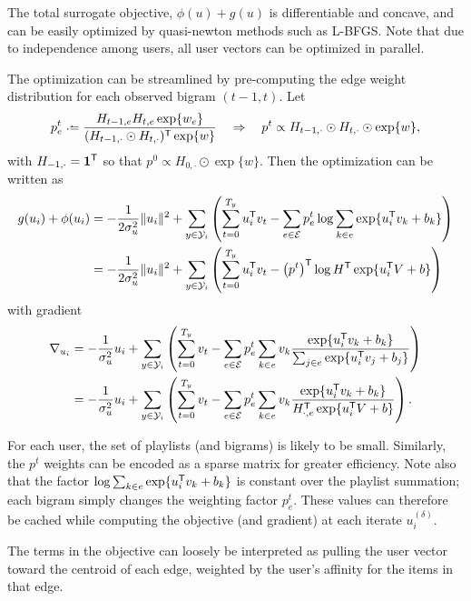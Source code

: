 \documentclass{article}
\def\E{\ensuremath{\mathcal{E}}}
\begin{document}
The total surrogate objective, $\phi(u) + g(u)$ is differentiable and concave, and can be easily optimized by quasi-newton methods such as L-BFGS.
Note that due to independence among users, all user vectors can be optimized in parallel.

The optimization can be streamlined by pre-computing the edge weight distribution for
each observed bigram $(t-1, t)$.  Let 
\[
p_e^t \defeq \frac{H_{t-1,e}H_{t,e} \exp\{w_e\}}{(H_{t-1,\cdot}\odot
H_{t,\cdot})\trans \exp\{w\}}
\quad \Rightarrow \quad p^t \propto H_{t-1,\cdot} \odot H_{t, \cdot} \odot \exp\{w\},
\]
with $H_{-1,\cdot} = \mathbf{1}^\mathsf{T}$ so that $p^0 \propto H_{0,\cdot} \odot \exp\{w\}$.  Then the optimization can be written as 
\begin{align}
g(u_i) + \phi(u_i) &= -\frac{1}{2\sigma_u^2} \|u_i\|^2 + \sum_{y \in \Y_i}
\left(\sum_{t=0}^{T_y} u_i\trans v_t - \sum_{e \in \E} p_e^t \log \sum_{k\in e}
\exp\{u_i\trans v_k + b_k\} \right)\\
&= - \frac{1}{2\sigma_u^2} \|u_i\|^2 + \sum_{y \in \Y_i} \left( 
\sum_{t=0}^{T_y} u_i\trans v_t - \left(p^t\right)\trans \log H\trans \exp \{u_i\trans V + b\} \right)
\end{align}
with gradient
\begin{align}
\nabla_{u_i} &= -\frac{1}{\sigma_u^2} u_i + \sum_{y \in \Y_i} \left(\sum_{t=0}^{T_y} v_t - \sum_{e \in \E} p_e^t \sum_{k\in e} v_k \frac{\exp\{u_i\trans v_k + b_k\}}{\sum_{j \in e}
\exp\{u_i \trans v_j + b_j\}} \right)\notag\\
&= -\frac{1}{\sigma_u^2} u_i + \sum_{y \in \Y_i} \left(\sum_{t=0}^{T_y} v_t - \sum_{e \in \E} p_e^t \sum_{k\in e} v_k \frac{\exp\{u_i\trans v_k + b_k\}}{H_{\cdot,e}\trans \exp\{u_i \trans
V + b\}} \right).\label{eq:ustep:gradient}
\end{align}

For each user, the set of playlists (and bigrams) is likely to be small.  Similarly,
the $p^t$ weights can be encoded as a sparse matrix for greater efficiency.  Note also
that the factor $\log \sum_{k\in e} \exp\{u_i^\mathsf{T} v_k + b_k \}$ is
constant over the playlist summation; each bigram simply changes the weighting factor
$p_e^t$.  These values can therefore be cached while computing the objective (and
gradient) at each iterate $u_i^{(\delta)}$.

The terms in the objective can loosely be interpreted as pulling the user vector
toward the centroid of each edge, weighted by the user's affinity for the items in
that edge.

\end{document}

